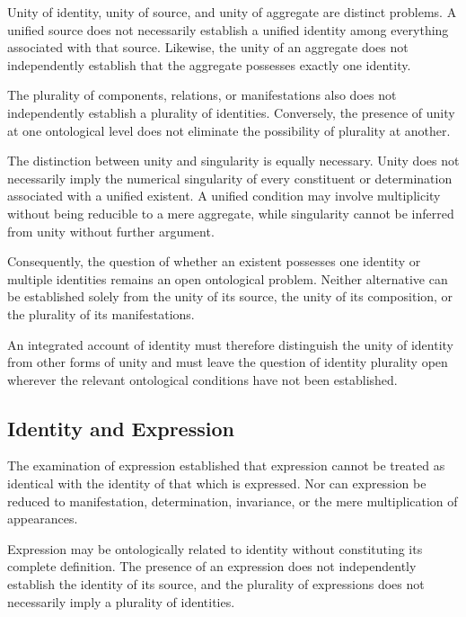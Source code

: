 Unity of identity, unity of source, and unity of aggregate
are distinct problems. A unified source does not necessarily
establish a unified identity among everything associated
with that source. Likewise, the unity of an aggregate does
not independently establish that the aggregate possesses
exactly one identity.

The plurality of components, relations, or manifestations
also does not independently establish a plurality of
identities. Conversely, the presence of unity at one
ontological level does not eliminate the possibility of
plurality at another.

The distinction between unity and singularity is equally
necessary. Unity does not necessarily imply the numerical
singularity of every constituent or determination associated
with a unified existent. A unified condition may involve
multiplicity without being reducible to a mere aggregate,
while singularity cannot be inferred from unity without
further argument.

Consequently, the question of whether an existent possesses
one identity or multiple identities remains an open
ontological problem. Neither alternative can be established
solely from the unity of its source, the unity of its
composition, or the plurality of its manifestations.

An integrated account of identity must therefore distinguish
the unity of identity from other forms of unity and must
leave the question of identity plurality open wherever the
relevant ontological conditions have not been established.


\subsection{Identity and Expression}

The examination of expression established that expression
cannot be treated as identical with the identity of that
which is expressed. Nor can expression be reduced to
manifestation, determination, invariance, or the mere
multiplication of appearances.

Expression may be ontologically related to identity without
constituting its complete definition. The presence of an
expression does not independently establish the identity
of its source, and the plurality of expressions does not
necessarily imply a plurality of identities.

